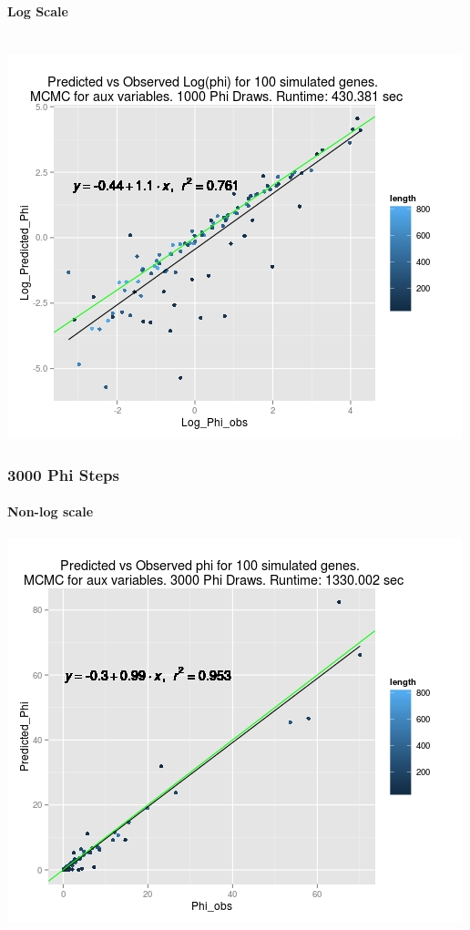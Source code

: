 \documentclass{article}
\begin{document}
	 	\paragraph{Log Scale}\\
	 	\includegraphics[scale=0.5]{../chosen_100/1000_steps/BIS10/Rplot02.jpeg}
	 	
	 \subsubsection{3000 Phi Steps}
	 
	 	\paragraph{Non-log scale}
	 	\includegraphics[scale=0.5]{../chosen_100/3000_steps/BIS10/Rplot01.jpeg}
\end{document}
